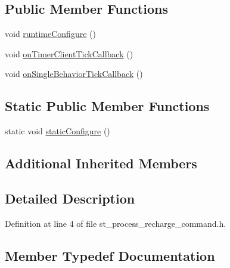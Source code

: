 \subsection*{Public Member Functions}
\begin{DoxyCompactItemize}
\item 
void \hyperlink{structsm__pr2__plugs_1_1StProcessRechargeCommand_ae401a2e897f446ddbde833e7686fcd7a}{runtime\+Configure} ()
\item 
void \hyperlink{structsm__pr2__plugs_1_1StProcessRechargeCommand_a71c620cbe618019ad7338c9b88639c68}{on\+Timer\+Client\+Tick\+Callback} ()
\item 
void \hyperlink{structsm__pr2__plugs_1_1StProcessRechargeCommand_acc2a9e8dbb67f236e16eafb4db51c3c5}{on\+Single\+Behavior\+Tick\+Callback} ()
\end{DoxyCompactItemize}
\subsection*{Static Public Member Functions}
\begin{DoxyCompactItemize}
\item 
static void \hyperlink{structsm__pr2__plugs_1_1StProcessRechargeCommand_ad4c6ec976c76402dd0fe6002036d2462}{static\+Configure} ()
\end{DoxyCompactItemize}
\subsection*{Additional Inherited Members}


\subsection{Detailed Description}


Definition at line 4 of file st\+\_\+process\+\_\+recharge\+\_\+command.\+h.



\subsection{Member Typedef Documentation}
\mbox{\label{structsm__pr2__plugs_1_1StProcessRechargeCommand_a97c8363f0989dc9dabc36a20445ba569}} 
